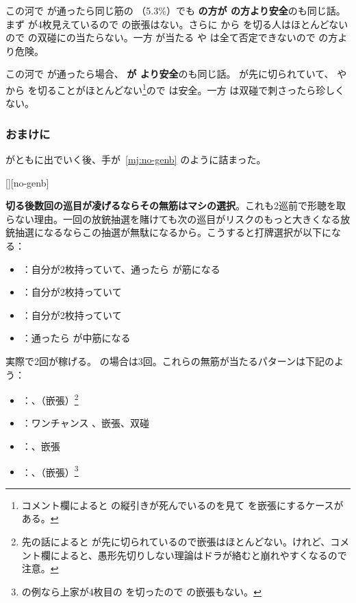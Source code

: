 \documentclass[../nankiru_main.tex]{subfiles}
\begin{document}
この河で  が通ったら同じ筋の （5.3\%）でも \textbf{ の方が  の方より安全}のも同じ話。まず  が4枚見えているので  の嵌張はない。さらに  から  を切る人はほとんどないので  の双碰にの当たらない。一方  が当たる  や  は全て否定できないので  の方より危険。

この河で  が通ったら場合、\textbf{ が  より安全}のも同じ話。 が先に切られていて、 や  から  を切ることがほとんどない\footnote{コメント欄によると  の縦引きが死んでいるのを見て  を嵌張にするケースがある。}ので  は安全。一方  は双碰で刺さったら珍しくない。

\subsubsection*{おまけに}

 がともに出でいく後、手が~\ref{mj:no-genb} のように詰まった。

[][no-genb]

\textbf{切る後数回の巡目が凌げるならその無筋はマシの選択}。これも2巡前で形聴を取らない理由。一回の放銃抽選を賭けても次の巡目がリスクのもっと大きくなる放銃抽選になるならこの抽選が無駄になるから。こうすると打牌選択が以下になる：

\begin{itemize}
\item {}：自分が2枚持っていて、通ったら  が筋になる
\item {}：自分が2枚持っていて
\item {}：自分が2枚持っていて
\item {}：通ったら  が中筋になる
\end{itemize}

実際で2回が稼げる。 の場合は3回。これらの無筋が当たるパターンは下記のよう：

\begin{itemize}
\item {}：、（嵌張）\footnote{先の話によると  が先に切られているので嵌張はほとんどない。けれど、コメント欄によると、愚形先切りしない理論はドラが絡むと崩れやすくなるので注意。}
\item {}：ワンチャンス 、嵌張、双碰
\item {}：、嵌張
\item {}：、（嵌張）\footnote{\citet{shibukawa-gukei}の例なら上家が4枚目の  を切ったので  の嵌張もない。}
\end{itemize}
\end{document}
